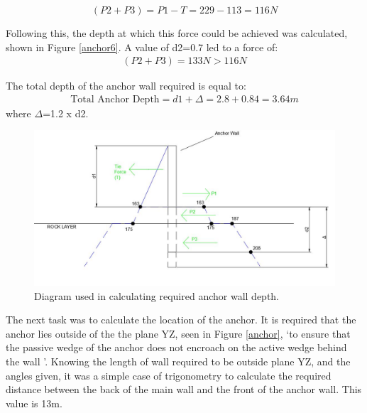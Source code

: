 \documentclass[12pt, a4paper]{article}
\begin{document}
\begin{equation}
    (P2+P3)= P1-T=229-113=116N
    \label{p12}
\end{equation}
\begin{justify}
Following this, the depth at which this force could be achieved was calculated, shown in Figure \ref{anchor6}. A value of d2=0.7 led to a force of:
\begin{gather}
    (P2+P3)=133N >116N
\end{gather}
 
\end{justify}
\begin{justify}
The total depth of the anchor wall required is equal to:
\begin{gather}
    \text{Total Anchor Depth}= d1+\Delta=2.8+0.84=3.64m
\end{gather}
where $\Delta$=1.2 x d2.
\end{justify}

\begin{figure}[H]
\centering
  	\includegraphics[width=0.6\textheight]{anchorwallfig}
   	\caption{Diagram used in calculating required anchor wall depth.}
	\label{anchorwall}
\end{figure}


\begin{justify}
The next task was to calculate the location of the anchor. It is required that the anchor lies outside of the the plane YZ, seen in Figure \ref{anchor}, `to ensure that the passive wedge of the anchor does not encroach on the active wedge behind the wall \cite{e}'. Knowing the length of wall required to be outside plane YZ, and the angles given, it was a simple case of trigonometry to calculate the required distance between the back of the main wall and the front of the anchor wall. This value is 13m.
\end{justify}
\end{document}
